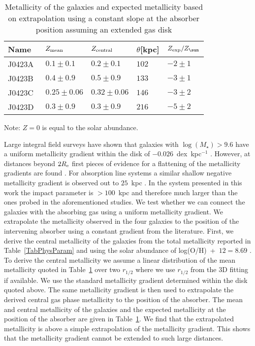 \documentclass[a4paper,fleqn,usenatbib]{mnras}
\newcommand{\GalA}{J0423A}
\newcommand{\GalB}{J0423B}
\newcommand{\GalC}{J0423C}
\newcommand{\GalD}{J0423D}
\begin{document}
{\begin{table}
\caption{Metallicity of the galaxies and expected metallicity based on extrapolation using a constant slope at the absorber position assuming an extended gas disk}
\label{TabMetalExtrapolation}
\centering
\begin{tabular}{l l l l l}
\hline
Name & $Z_{\rm mean}$ & $Z_{\rm central}$& $\theta$[kpc] & $Z_{\rm exp}/Z_{\sun}$\\
\hline
\GalA\ & $0.1 \pm 0.1$ & $0.2 \pm 0.1$ & $102$ & $-2 \pm 1$\\
\GalB\ & $0.4 \pm 0.9$ & $0.5 \pm 0.9$ & $133$ & $-3 \pm 1$\\
\GalC\ & $0.25 \pm 0.06$ & $0.32 \pm 0.06$ & $146$ & $-3 \pm 2$\\
\GalD\ & $0.3 \pm 0.9$ & $0.3 \pm 0.9$ & $216$ & $-5 \pm 2$\\
\hline
\end{tabular}
\begin{minipage}{\linewidth}
Note: $Z = 0$ is equal to the solar abundance.
\end{minipage}
\end{table}


Large integral field surveys have shown that galaxies with $\log(M_{\star} )> 9.6$ have a uniform metallicity gradient within the disk of $-0.026$~dex~kpc$^{-1}$ \mbox{\citet{Ho2015Metallicity}}. However, at distances beyond $2R_{\rm e}$ first pieces of evidence for a flattening of the metallicity gradients are found \citep{Belfiore2017sdss}. For absorption line systems a similar shallow negative metallicity gradient is observed out to $25$~kpc \citep[e.g.][]{Peroux2014sinfoni, Christensen2014verifying, Rahmani2017observational}. In the system presented in this work the impact parameter is $>100$~kpc and therefore much larger than the ones probed in the aforementioned studies. We test whether we can connect the galaxies with the absorbing gas using a uniform metallicity gradient.
We extrapolate the metallicity observed in the four galaxies to the position of the intervening absorber using a constant gradient from the literature. First, we derive the central metallicity of the galaxies from the total metallicity reported in Table~\ref{TabPhysParam} and using the solar abundance of \mbox{log(O/H) + $12 = 8.69$} \mbox{\citep{Asplund2009chemical}}. To derive the central metallicity we assume a linear distribution of the mean metallicity quoted in Table~\ref{TabMetalExtrapolation} over two $r_{1/2}$ where we use $r_{1/2}$ from the 3D fitting if available. We use the standard metallicity gradient determined within the disk quoted above. The same metallicity gradient is then used to extrapolate the derived central gas phase metallicity to the position of the absorber. The mean and central metallicity of the galaxies and the expected metallicity at the position of the absorber are given in Table~\ref{TabMetalExtrapolation}. We find that the extrapolated metallicity is above a simple extrapolation of the metallicity gradient. This shows that the metallicity gradient cannot be extended to such large distances.\\

}
\end{document}
